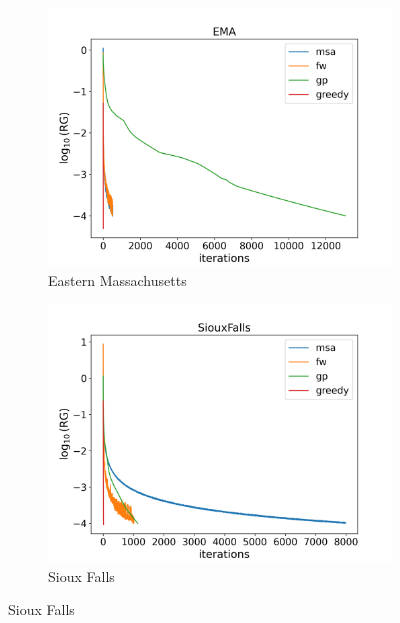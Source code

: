 \begin{figure}
\begin{subfigure}{0.5\linewidth}
\includegraphics[width=\textwidth]{figures/EMA.png}
\caption{Eastern Massachusetts}
\end{subfigure}
\hfill
\begin{subfigure}{0.5\linewidth}
\centering
\includegraphics[width=\textwidth]{figures/SiouxFalls.png}
\caption{Sioux Falls}
\end{subfigure}
\label{plots}
\end{figure}

